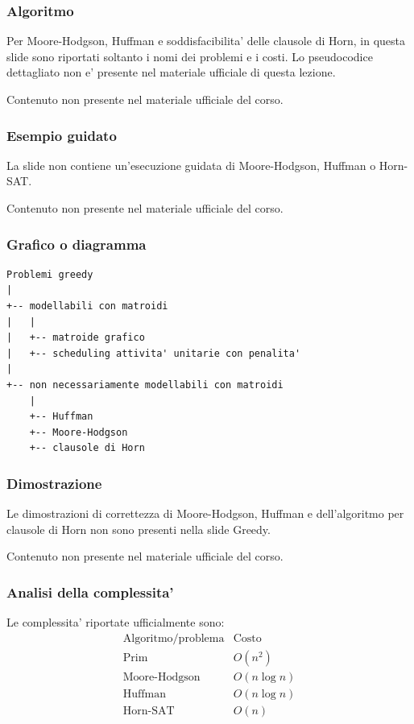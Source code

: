 \subsubsection{Algoritmo}
Per Moore-Hodgson, Huffman e soddisfacibilita' delle clausole di Horn, in questa slide sono riportati soltanto i nomi dei problemi e i costi. Lo pseudocodice dettagliato non e' presente nel materiale ufficiale di questa lezione.

\begin{hardnote}
Contenuto non presente nel materiale ufficiale del corso.
\end{hardnote}

\subsubsection{Esempio guidato}
La slide non contiene un'esecuzione guidata di Moore-Hodgson, Huffman o Horn-SAT.

\begin{hardnote}
Contenuto non presente nel materiale ufficiale del corso.
\end{hardnote}

\subsubsection{Grafico o diagramma}
\begin{center}
\begin{verbatim}
Problemi greedy
|
+-- modellabili con matroidi
|   |
|   +-- matroide grafico
|   +-- scheduling attivita' unitarie con penalita'
|
+-- non necessariamente modellabili con matroidi
    |
    +-- Huffman
    +-- Moore-Hodgson
    +-- clausole di Horn
\end{verbatim}
\end{center}

\subsubsection{Dimostrazione}
Le dimostrazioni di correttezza di Moore-Hodgson, Huffman e dell'algoritmo per clausole di Horn non sono presenti nella slide Greedy.

\begin{hardnote}
Contenuto non presente nel materiale ufficiale del corso.
\end{hardnote}

\subsubsection{Analisi della complessita'}
Le complessita' riportate ufficialmente sono:
\[
\begin{array}{c|c}
\text{Algoritmo/problema} & \text{Costo} \\
\hline
\text{Prim} & O(n^2) \\
\text{Moore-Hodgson} & O(n\log n) \\
\text{Huffman} & O(n\log n) \\
\text{Horn-SAT} & O(n)
\end{array}
\]

